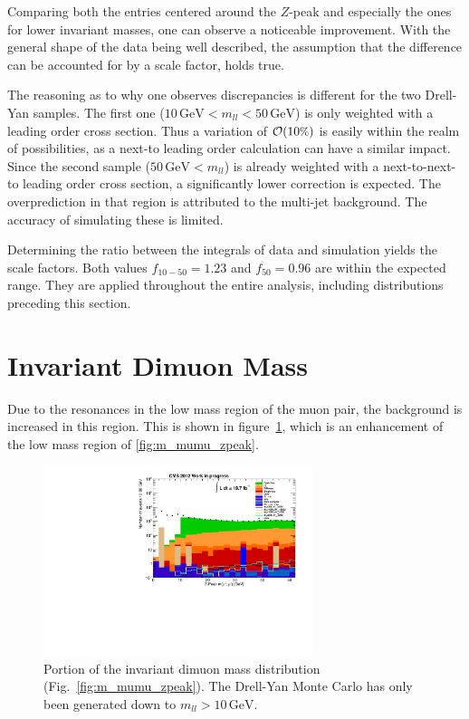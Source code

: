 \noindent Comparing both the entries centered around the $Z$-peak and especially the ones for lower invariant masses, one can observe a noticeable improvement. With the general shape of the data being well described, the assumption that the difference can be accounted for by a scale factor, holds true. 

The reasoning as to why one observes discrepancies is different for the two Drell-Yan samples. The first one ($10\,\text{GeV} < m_{ll} < 50\,\text{GeV}$) is only weighted with a leading order cross section. Thus a variation of $\mathcal{O}(10\pct)$ is easily within the realm of possibilities, as a next-to leading order calculation can have a similar impact. Since the second sample ($50\,\text{GeV} < m_{ll}$) is already weighted with a next-to-next-to leading order cross section, a significantly lower correction is expected. The overprediction in that region is attributed to the multi-jet background. The accuracy of simulating these is limited.

Determining the ratio between the integrals of data and simulation yields the scale factors. Both values $f_{10-50} = 1.23$ and $f_{50} = 0.96$ are within the expected range. They are applied throughout the entire analysis, including distributions preceding this section.


\section{Invariant Dimuon Mass}
\label{sec:m_mumu}

Due to the resonances in the low mass region of the muon pair, the background is increased in this region. This is shown in figure~\ref{fig:m_mumu_zpeak_zoom}, which is an enhancement of the low mass region of \ref{fig:m_mumu_zpeak}.

\begin{figure}[ht!]
  \centering
    \includegraphics[width=0.7\textwidth]{plots/m_mumu_zpeak_zoom.pdf}
  \caption{Portion of the invariant dimuon mass distribution (Fig.~\ref{fig:m_mumu_zpeak}). The Drell-Yan Monte Carlo has only been generated down to $m_{ll} > 10\,\text{GeV}$.}
  \label{fig:m_mumu_zpeak_zoom}
\end{figure}

